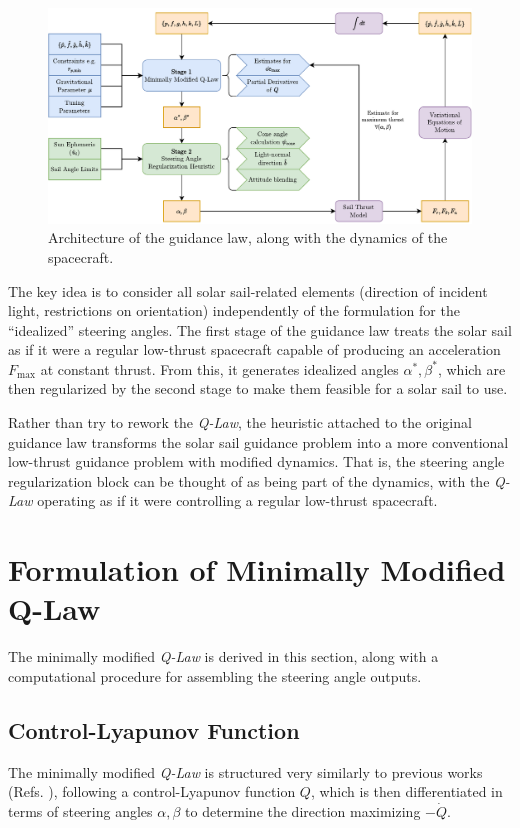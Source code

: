 \begin{figure}[H]
    \centering
\includegraphics[width=\textwidth]{figures/compute_topology.drawio.pdf}
    \caption{Architecture of the guidance law, along with the dynamics of the spacecraft.}
    \label{fig:algorithm_diagram}
\end{figure}

The key idea is to consider all solar sail-related elements (direction of incident light, restrictions on orientation) independently of the formulation for the ``idealized'' steering angles. The first stage of the guidance law treats the solar sail as if it were a regular low-thrust spacecraft capable of producing an acceleration $F_{\max}$ at constant thrust. From this, it generates idealized angles $\alpha^*, \beta^*$, which are then regularized by the second stage to make them feasible for a solar sail to use.

Rather than try to rework the \textit{Q-Law}, the heuristic attached to the original guidance law transforms the solar sail guidance problem into a more conventional low-thrust guidance problem with modified dynamics. That is, the steering angle regularization block can be thought of as being part of the dynamics, with the \textit{Q-Law} operating as if it were controlling a regular low-thrust spacecraft.

\section{Formulation of Minimally Modified Q-Law}
The minimally modified \textit{Q-Law} is derived in this section, along with a computational procedure for assembling the steering angle outputs.

\subsection{Control-Lyapunov Function}
The minimally modified \textit{Q-Law} is structured very similarly to previous works (Refs. \cite{petropoulos2004low, vargaperez2016, sanjeev2023}), following a control-Lyapunov function $Q$, which is then differentiated in terms of steering angles $\alpha, \beta$ to determine the direction maximizing $-\dot{Q}$.

